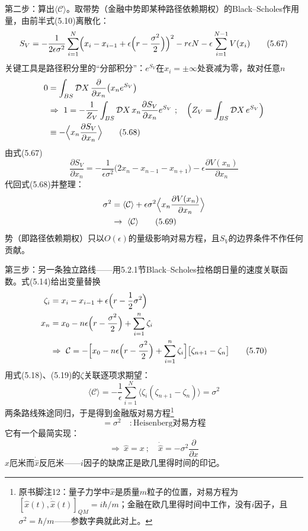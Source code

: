 第二步：算出$\langle\mathcal{C}\rangle$。取带势（金融中势即某种路径依赖期权）的Black--Scholes作用量，由前半式(5.10)离散化：
\begin{equation*}
S_{V}=-\frac{1}{2\epsilon\sigma^{2}}\sum_{i=1}^{N}
\Bigl(x_i-x_{i-1}+\epsilon\Bigl(r-\frac{\sigma^{2}}{2}\Bigr)\Bigr)^{2}
-r\epsilon N-\epsilon\sum_{i=1}^{N-1}V(x_i)
\tag{5.67}
\end{equation*}
关键工具是路径积分里的“分部积分”：$e^{S_V}$在$x_i=\pm\infty$处衰减为零，故对任意$n$
\begin{align*}
0&=\int_{BS}\mathcal{D}X\,\frac{\partial}{\partial x_n}
\bigl(x_ne^{S_V}\bigr)\\
&\Rightarrow\ 1=-\frac{1}{Z_V}\int_{BS}\mathcal{D}X\,
x_n\frac{\partial S_V}{\partial x_n}e^{S_V}\ ;\quad
\Bigl(Z_V=\int_{BS}\mathcal{D}X\,e^{S_V}\Bigr)\\
&\equiv-\Bigl\langle x_n\frac{\partial S_V}{\partial x_n}\Bigr\rangle
\tag{5.68}
\end{align*}
由式(5.67)
\begin{equation*}
\frac{\partial S_V}{\partial x_n}=-\frac{1}{\epsilon\sigma^{2}}
\bigl(2x_n-x_{n-1}-x_{n+1}\bigr)-\epsilon\frac{\partial V(x_n)}{\partial x_n}
\end{equation*}
代回式(5.68)并整理：
\begin{align*}
\sigma^{2}&=\langle\mathcal{C}\rangle
+\epsilon\sigma^{2}\Bigl\langle x_n\frac{\partial V(x_n)}{\partial x_n}\Bigr\rangle\\
&\to\ \langle\mathcal{C}\rangle
\tag{5.69}
\end{align*}
势（即路径依赖期权）只以$O(\epsilon)$的量级影响对易方程，且$S_V$的边界条件不作任何贡献。

第三步：另一条独立路线——用5.2.1节Black--Scholes拉格朗日量的速度关联函数。式(5.14)给出变量替换
\begin{align*}
\zeta_i&=x_i-x_{i-1}+\epsilon\Bigl(r-\frac{1}{2}\sigma^{2}\Bigr)\\
x_n&=x_0-n\epsilon\Bigl(r-\frac{\sigma^{2}}{2}\Bigr)+\sum_{i=1}^{n}\zeta_i\\
&\Rightarrow\ \mathcal{C}=-\Bigl[x_0-n\epsilon\Bigl(r-\frac{\sigma^{2}}{2}\Bigr)
+\sum_{i=1}^{n}\zeta_i\Bigr]\bigl[\zeta_{n+1}-\zeta_n\bigr]
\tag{5.70}
\end{align*}
用式(5.18)、(5.19)的$\zeta$关联逐项求期望：
\begin{equation*}
\langle\mathcal{C}\rangle=-\frac{1}{\epsilon}\sum_{i=1}^{N}
\bigl\langle\zeta_i(\zeta_{n+1}-\zeta_n)\bigr\rangle=\sigma^{2}
\tag{5.71}
\end{equation*}
两条路线殊途同归，于是得到金融版对易方程\footnote{原书脚注12：量子力学中$\hat{x}$是质量$m$粒子的位置，对易方程为$[\hat{x}(t),\dot{\hat{x}}(t)]_{QM}=i\hbar/m$；金融在欧几里得时间中工作，没有$i$因子，且$\sigma^2=\hbar/m$——参数字典就此对上。}
\begin{equation*}
[\hat{x}(t),\dot{\hat{x}}(t)]=\sigma^{2}\quad:
\text{Heisenberg对易方程}
\tag{5.72}
\end{equation*}
它有一个最简实现：
\begin{equation*}
\Rightarrow\ \hat{x}=x\ ;\quad\dot{\hat{x}}=-\sigma^{2}\frac{\partial}{\partial x}
\end{equation*}
$\hat{x}$厄米而$\dot{\hat{x}}$反厄米——$i$因子的缺席正是欧几里得时间的印记。

